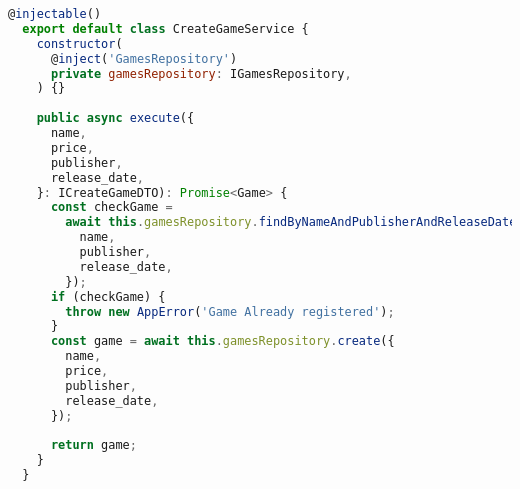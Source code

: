 \begin{lstlisting}[language=JavaScript, caption={O Caso de Uso},captionpos=b, label=alg:usecase]
  @injectable()
  export default class CreateGameService {
    constructor(
      @inject('GamesRepository')
      private gamesRepository: IGamesRepository,
    ) {}
  
    public async execute({
      name,
      price,
      publisher,
      release_date,
    }: ICreateGameDTO): Promise<Game> {
      const checkGame =
        await this.gamesRepository.findByNameAndPublisherAndReleaseDate({
          name,
          publisher,
          release_date,
        });
      if (checkGame) {
        throw new AppError('Game Already registered');
      }
      const game = await this.gamesRepository.create({
        name,
        price,
        publisher,
        release_date,
      });
  
      return game;
    }
  }
\end{lstlisting}
